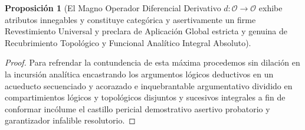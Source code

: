 \documentclass[11pt,a4paper]{article}
\theoremstyle{definition}
\newtheorem{proposicion}{Proposición}[section]
\theoremstyle{remark}
\numberwithin{equation}{section}
\begin{document}
\begin{proposicion}[El Magno Operador Diferencial Derivativo $d: \mathcal{O} \to \mathcal{O}$ exhibe atributos innegables y constituye categórica y asertivamente un firme Revestimiento Universal y preclara de Aplicación Global estricta y genuina de Recubrimiento Topológico y Funcional Analítico Integral Absoluto]
\end{proposicion}
\begin{proof}
Para refrendar la contundencia de esta máxima procedemos sin dilación en la incursión analítica encastrando los argumentos lógicos deductivos en un acueducto secuenciado y acorazado e inquebrantable argumentativo dividido en compartimientos lógicos y topológicos disjuntos y sucesivos integrales a fin de conformar incólume el castillo pericial demostrativo asertivo probatorio y garantizador infalible resolutorio.


\end{proof}
\end{document}
